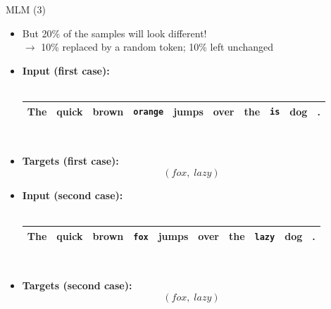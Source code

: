 \begin{frame}{MLM (3)}

\begin{itemize}
\item \warning But 20\% of the samples will look different!\\
			$\to$ 10\% replaced by a random token; 10\% left unchanged
\item \normalsize \textbf{Input (first case):}\\\mbox{}\\
			\footnotesize
\begin{tabular}{|cccccccccc|}
\hline
The & quick & brown & \cellcolor{blue!65}\texttt{orange} & jumps & over & the & \cellcolor{blue!65}\texttt{is} & dog & . \\
\hline
\end{tabular}\\\mbox{}
\item \normalsize \textbf{Targets (first case):} $$(fox,\; lazy)$$
\item \normalsize \textbf{Input (second case):}\\\mbox{}\\
			\footnotesize
\begin{tabular}{|cccccccccc|}
\hline
The & quick & brown & \cellcolor{blue!65}\texttt{fox} & jumps & over & the & \cellcolor{blue!65}\texttt{lazy} & dog & . \\
\hline
\end{tabular}\\\mbox{}
\item \normalsize \textbf{Targets (second case):} $$(fox,\; lazy)$$
\end{itemize}

\end{frame}

